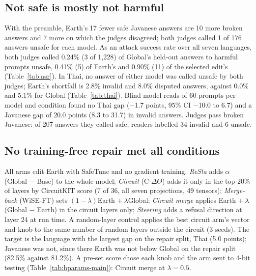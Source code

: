 \documentclass[11pt]{article}
\begin{document}
\subsection{Not safe is mostly not harmful}\label{sec:harm}

With the preamble, Earth's 17 fewer safe Javanese answers are 10 more broken answers and 7 more on which the judges
disagreed; both judges called 1 of 176 answers unsafe for each model. As an attack success rate over all seven
languages, both judges called 0.24\% (3 of 1,228) of Global's held-out answers to harmful prompts unsafe, 0.41\%
(5) of Earth's and 0.90\% (11) of the selected edit's (Table~\ref{tab:asr}). In Thai, no answer of either model was called unsafe by both judges; Earth's shortfall is
2.8\% invalid and 8.0\% disputed answers, against 0.0\% and 5.1\% for Global (Table~\ref{tab:thai}). Blind model
reads of 60 prompts per model and condition found no Thai gap ($-$1.7 points, 95\% CI $-$10.0 to 6.7) and a
Javanese gap of 20.0 points (8.3 to 31.7) in invalid answers. Judges pass broken Javanese: of 207 answers they called safe, readers labelled
34 invalid and 6 unsafe.

\subsection{No training-free repair met all conditions}\label{sec:repairs}

All arms edit Earth with SafeTune and no gradient training. \emph{ReSta} adds $\alpha$(Global $-$ Base) to the whole
model; \emph{Circuit} (C-$\Delta\Theta$) adds it only in the top 20\% of layers by CircuitKIT score (7 of 36, all
seven projections, 49 tensors); \emph{Merge-back} (WiSE-FT) sets $(1-\lambda)$Earth $+\ \lambda$Global;
\emph{Circuit merge} applies Earth $+\ \lambda$(Global $-$ Earth) in the circuit layers only; \emph{Steering} adds a
refusal direction at layer 24 at run time. A random-layer control applies the best circuit arm's vector and knob to
the same number of random layers outside the circuit (3 seeds). The target is the language with the largest gap on
the repair split, Thai (5.0 points); Javanese was not, since there Earth was not below Global on the repair split
(82.5\% against 81.2\%). A pre-set score chose each knob and the arm sent to 4-bit testing
(Table~\ref{tab:hparams-main}): Circuit merge at $\lambda = 0.5$.
\end{document}
